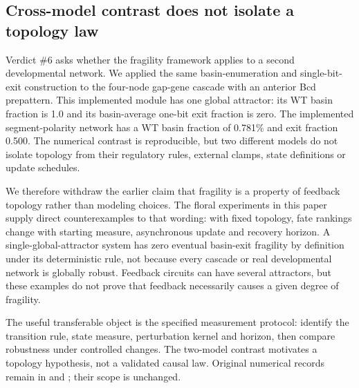 \subsection{Cross-model contrast does not isolate a topology law}
Verdict \#6 asks whether the fragility framework applies to a second developmental network. We applied the same basin-enumeration and single-bit-exit construction to the four-node gap-gene cascade with an anterior Bcd prepattern. This implemented module has one global attractor: its WT basin fraction is 1.0 and its basin-average one-bit exit fraction is zero. The implemented segment-polarity network has a WT basin fraction of 0.781\% and exit fraction 0.500. The numerical contrast is reproducible, but two different models do not isolate topology from their regulatory rules, external clamps, state definitions or update schedules.

We therefore withdraw the earlier claim that fragility is a property of feedback topology rather than modeling choices. The floral experiments in this paper supply direct counterexamples to that wording: with fixed topology, fate rankings change with starting measure, asynchronous update and recovery horizon. A single-global-attractor system has zero eventual basin-exit fragility by definition under its deterministic rule, not because every cascade or real developmental network is globally robust. Feedback circuits can have several attractors, but these examples do not prove that feedback necessarily causes a given degree of fragility.

The useful transferable object is the specified measurement protocol: identify the transition rule, state measure, perturbation kernel and horizon, then compare robustness under controlled changes. The two-model contrast motivates a topology hypothesis, not a validated causal law. Original numerical records remain in  and ; their scope is unchanged.
